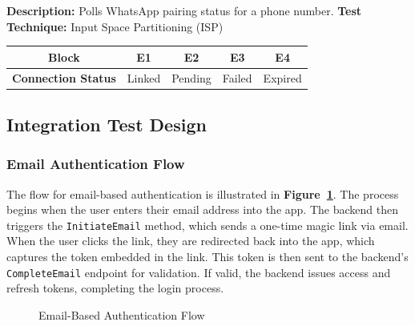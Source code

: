 \textbf{Description:} Polls WhatsApp pairing status for a phone number.  
\textbf{Test Technique:} Input Space Partitioning (ISP)

\begin{table}[h!]
\centering
\begin{tabular}{|c|c|c|c|c|}
\hline
\textbf{Block} & \textbf{E1} & \textbf{E2} & \textbf{E3} & \textbf{E4} \\
\hline
\textbf{Connection Status} & Linked & Pending & Failed & Expired \\
\hline
\end{tabular}
\end{table}

\subsection{Integration Test Design}

\subsubsection*{Email Authentication Flow}

The flow for email-based authentication is illustrated in \textbf{Figure~\ref{fig:email-auth-flow}}. The process begins when the user enters their email address into the app. The backend then triggers the \texttt{InitiateEmail} method, which sends a one-time magic link via email. When the user clicks the link, they are redirected back into the app, which captures the token embedded in the link. This token is then sent to the backend's \texttt{CompleteEmail} endpoint for validation. If valid, the backend issues access and refresh tokens, completing the login process.

\begin{figure}[h!]
    \centering
    \caption{Email-Based Authentication Flow}
    \label{fig:email-auth-flow}
\end{figure}    

